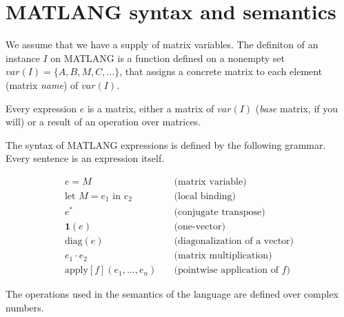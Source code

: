 \section{MATLANG syntax and semantics}

We assume that we have a supply of matrix variables. The definiton of an instance $I$ on MATLANG is a function defined on a nonempty set $var(I)=\lbrace A, B, M, C,  \ldots\rbrace$, that assigns a concrete matrix to each element (matrix \textit{name}) of $var(I)$.


Every expression $e$ is a matrix, either a matrix of $var(I)$ (\textit{base} matrix, if you will) or a result of an operation over matrices.
  
The syntax of MATLANG expressions is defined by the following grammar. Every sentence is an expression itself.

\begin{align*}
	e=M\hspace{1em}&\text{(matrix variable)} \\
	\text{let } M=e_1 \text{ in } e_2\hspace{1em}&\text{(local binding)} \\
	e^*\hspace{1em}&\text{(conjugate transpose)} \\
	\mathbf{1}(e)\hspace{1em}&\text{(one-vector)} \\
	\text{diag}(e)\hspace{1em}&\text{(diagonalization of a vector)} \\
	e_1\cdot e_2\hspace{1em}&\text{(matrix multiplication)} \\
	\text{apply}\left[ f \right](e_1, \ldots, e_n)\hspace{1em}&\text{(pointwise application of $f$)}
\end{align*}

The operations used in the semantics of the language are defined over complex numbers.

